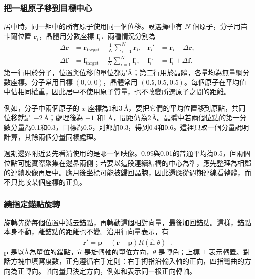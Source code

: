 \subsubsection{把一組原子移到目標中心}

居中時，同一組中的所有原子使用同一個位移。設選擇中有 $N$ 個原子，分子用笛卡爾位置 $\mathbf r_i$，晶體用分數座標 $\mathbf f_i$，兩種情況分別為
\begin{equation}
 \begin{aligned}
 \Delta\mathbf r&=\mathbf r_{\mathrm{target}}-
        \frac1N\sum_{i=1}^{N}\mathbf r_i,
 &\mathbf r_i'&=\mathbf r_i+\Delta\mathbf r,\\
 \Delta\mathbf f&=\mathbf f_{\mathrm{target}}-
        \frac1N\sum_{i=1}^{N}\mathbf f_i,
 &\mathbf f_i'&=\mathbf f_i+\Delta\mathbf f.
 \end{aligned}
 \label{eq:center-selected-atoms}
\end{equation}
第一行用於分子，位置與位移的單位都是\AA；第二行用於晶體，各量均為無量綱分數座標。分子常用目標 $(0,0,0)$，晶體常用 $(0.5,0.5,0.5)$。每個原子在平均值中佔相同權重，因此居中不使用原子質量，也不改變所選原子之間的距離。

例如，分子中兩個原子的 $x$ 座標為1和3\,\AA，要把它們的平均位置移到原點，共同位移就是 $-2\,\text{\AA}$；處理後為 $-1$ 和1\,\AA，間距仍為2\,\AA。晶體中若兩個位點的第一分數分量為0.1和0.3，目標為0.5，則都加0.3，得到0.4和0.6。這裡只取一個分量說明計算，其餘兩個分量同樣處理。

週期邊界附近要先看清使用的是哪一個映像。0.99與0.01的普通平均為0.5，但兩個位點可能實際聚集在邊界兩側；若要以這段連續結構的中心為準，應先整理為相鄰的連續映像再居中。應用後坐標可能被歸回晶胞，因此還應從週期連線看整體，而不只比較某個座標的正負。

\subsubsection{繞指定錨點旋轉}

旋轉先從每個位置中減去錨點，再轉動這個相對向量，最後加回錨點。這樣，錨點本身不動，離錨點的距離也不變。沿用行向量表示，有
\begin{equation}
 \mathbf r'=\mathbf p+(\mathbf r-\mathbf p)
              R(\hat{\mathbf n},\theta)^{\mathsf T}.
 \label{eq:rotate-row-position}
\end{equation}
$\mathbf p$ 是以\AA 為單位的錨點，$\hat{\mathbf n}$ 是旋轉軸的單位方向，$\theta$ 是轉角；上標 $\mathsf T$ 表示轉置。對話方塊中填寫度數，正角遵循右手定則：右手拇指沿輸入軸的正向，四指彎曲的方向為正轉向。軸向量只決定方向，例如和表示同一根正向轉軸。

